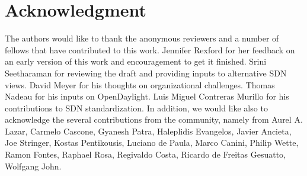 \documentclass[journal]{IEEEtran}
\newcommand{\coloredtext}[1]{#1\xspace}
\begin{document}



\section*{Acknowledgment}

The authors would like to thank the anonymous reviewers and a number of fellows that have contributed to this work. 
Jennifer Rexford for her feedback on an early version of this work and encouragement to get it finished. 
Srini Seetharaman for reviewing the draft and providing inputs to alternative SDN views. David Meyer for his thoughts on organizational challenges. 
\coloredtext{Thomas Nadeau for his inputs on OpenDaylight. 
Luis Miguel Contreras Murillo for his contributions to SDN standardization. 
In addition, we would like also to acknowledge the several contributions from the community, namely from Aurel A. Lazar, Carmelo Cascone, Gyanesh Patra, Haleplidis Evangelos, Javier Ancieta, Joe Stringer, Kostas Pentikousis, Luciano de Paula, Marco Canini, Philip Wette, Ramon Fontes, Raphael Rosa, Regivaldo Costa, Ricardo de Freitas Gesuatto, Wolfgang John.}

\ifCLASSOPTIONcaptionsoff
  \newpage
\fi





%
%
%
%
%
\end{document}
